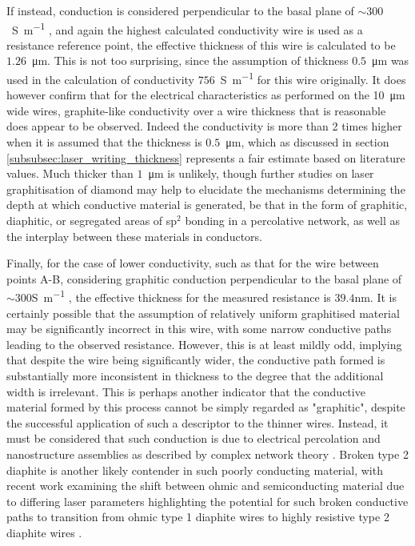 \begin{refsection}
If instead, conduction is considered perpendicular to the basal plane of $\sim300$~\si{\siemens\per\metre} \cite{pierson1993}, and again the highest calculated conductivity wire is used as a resistance reference point, the effective thickness of this wire is calculated to be $1.26$~\si{\micro\metre}. This is not too surprising, since the assumption of thickness $0.5$~\si{\micro\metre} was used in the calculation of conductivity $756$~\si{\siemens\per\metre} for this wire originally. It does however confirm that for the electrical characteristics as performed on the 10~\si{\micro\metre} wide wires, graphite-like conductivity over a wire thickness that is reasonable does appear to be observed. Indeed the conductivity is more than 2 times higher when it is assumed that the thickness is $0.5$~\si{\micro\metre}, which as discussed in section \ref{subsubsec:laser_writing_thickness} represents a fair estimate based on literature values. Much thicker than $1$~\si{\micro\metre} is unlikely, though further studies on laser graphitisation of diamond may help to elucidate the mechanisms determining the depth at which conductive material is generated, be that in the form of graphitic, diaphitic, or segregated areas of sp$^{2}$ bonding in a percolative network, as well as the interplay between these materials in conductors.

Finally, for the case of lower conductivity, such as that for the wire between points A-B, considering graphitic conduction perpendicular to the basal plane of $\sim300$\si{\siemens\per\metre} \cite{pierson1993}, the effective thickness for the measured resistance is $39.4$\si{\nano\metre}. It is certainly possible that the assumption of relatively uniform graphitised material may be significantly incorrect in this wire, with some narrow conductive paths leading to the observed resistance. However, this is at least mildly odd, implying that despite the wire being significantly wider, the conductive path formed is substantially more inconsistent in thickness to the degree that the additional width is irrelevant. This is perhaps another indicator that the conductive material formed by this process cannot be simply regarded as "graphitic", despite the successful application of such a descriptor to the thinner wires. Instead, it must be considered that such conduction is due to electrical percolation and nanostructure assemblies as described by complex network theory \cite{mclachlan1990, yao2020}. Broken type 2 diaphite is another likely contender in such poorly conducting material, with recent work examining the shift between ohmic and semiconducting material due to differing laser parameters highlighting the potential for such broken conductive paths to transition from ohmic type 1 diaphite wires to highly resistive type 2 diaphite wires \cite{salter2024}.


\end{refsection}
